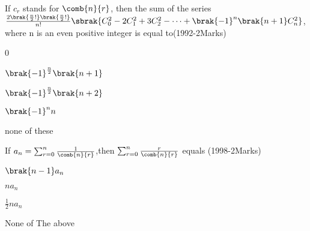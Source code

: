  \iffalse
    \title{Assignment}
    \author{Kotha Pratheek Reddy}
    \section{mcq-multiple}
  \fi
	\item If $c_r$ stands for $\comb{n}{r}$, then the sum of the series $\frac{2\brak{\frac{n}{2}!}\brak{\frac{n}{2}!}}{n!}\sbrak{C_0^2-2C_1^2+3C_2^2-\dots+\brak{-1}^n\brak{n+1}C_n^2}$, where n is an even positive integer is equal to\hfill(1992-2Marks)
\begin{enumerate}
\begin{multicols}{2}
\item 0
\item $\brak{-1}^{\frac{n}{2}}\brak{n+1}$
\item $\brak{-1}^{\frac{n}{2}}\brak{n+2}$
\item $\brak{-1}^n n$
\item none of these
\end{multicols}
\end{enumerate}
\item If $a_n = \sum_{r=0}^{n}\frac{1}{\comb{n}{r}}$,then $\sum_{r=0}^{n}\frac{r}{\comb{n}{r}}$ equals \hfill(1998-2Marks)
\begin{enumerate}
\begin{multicols}{2}
\item $\brak{n-1}a_n$
\item $na_n$
\item $\frac{1}{2}na_n$
\item None of The above
\end{multicols}
\end{enumerate}



